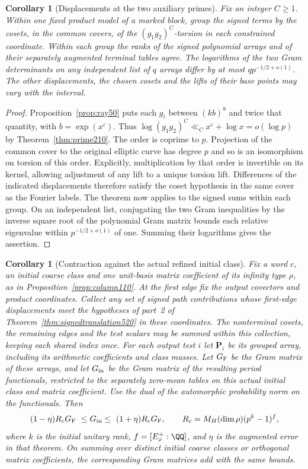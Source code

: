 \documentclass[a4paper,11pt]{article}
\newtheorem{corollary}[proposition]{Corollary}
\theoremstyle{definition}
\theoremstyle{remark}
\numberwithin{equation}{section}
\begin{document}
\begin{corollary}[Displacements at the two auxiliary primes]\leavevmode
\label{cor:flagshifts520}
Fix an integer \(C\ge1\). Within one fixed product model of a
marked block, group the signed terms by the cosets, in the common
covers, of the \((g_1g_2)^C\)-torsion in each constrained coordinate.
Within each group the ranks of the signed polynomial arrays and of
their separately augmented terminal tables agree. The logarithms
of the two Gram determinants on any independent list of \(q\) arrays
differ by at most \(q p^{-1/2+o(1)}\). The other displacements,
the chosen cosets and the lifts of their base points may vary with
the interval.
\end{corollary}
\begin{proof}
Proposition~\ref{prop:ray50} puts each \(g_i\) between \((kb)^8\)
and twice that quantity, with \(b=\exp(x^\varepsilon)\). Thus
\(\log (g_1g_2)^C\ll_C x^\varepsilon+\log x=o(\log p)\) by
Theorem~\ref{thm:prime210}. The order is coprime to \(p\).
Projection of the common cover to the original elliptic curve
has degree \(p\) and so is an isomorphism on torsion of this
order. Explicitly, multiplication by that order is invertible
on its kernel, allowing adjustment of any lift to a unique torsion
lift. Differences of the indicated displacements therefore satisfy
the coset hypothesis in the same cover as the Fourier labels.
The theorem now applies to the signed sums within each group. On
an independent list, conjugating the two Gram inequalities by the
inverse square root of the polynomial Gram matrix bounds each
relative eigenvalue within \(p^{-1/2+o(1)}\) of one. Summing their
logarithms gives the assertion.
\end{proof}
\begin{corollary}[Contraction against the actual refined initial class]
\leavevmode\label{cor:actualsource520}
Fix a word \(c\), an initial coarse class and one unit-basis matrix
coefficient of its infinity type \(\rho\), as in
Proposition~\ref{prop:column110}. At the first edge fix the output
covectors and product coordinates. Collect any set of signed path
contributions whose first-edge displacements meet the hypotheses of
part~2 of Theorem~\ref{thm:signedtranslation520} in these coordinates.
The nonterminal cosets, the remaining edges and the test scalars may
be summed within this collection, keeping each shared index once.
For each output test \(i\) let \(\boldsymbol P_i\) be its grouped
array, including its arithmetic coefficients and class masses. Let
\(G_{\rm F}\) be the Gram matrix of these arrays, and let
\(G_{\rm in}\) be the Gram matrix of the resulting period
functionals, restricted to the separately zero-mean tables on
this actual initial class and matrix coefficient. Use the dual of
the automorphic probability norm on the functionals. Then
\[
 (1-\eta)R_cG_{\rm F}\ \le G_{\rm in}\le\ (1+\eta)R_cG_{\rm F},
 \qquad R_c=M_H(\dim\rho)(p^k-1)^f ,
\]
where \(k\) is the initial unitary rank, \(f=[E_x^+:\QQ]\), and
\(\eta\) is the augmented error in that theorem. On summing over
distinct initial coarse classes or orthogonal matrix coefficients,
the corresponding Gram matrices add with the same bounds.
\end{corollary}
\end{document}
